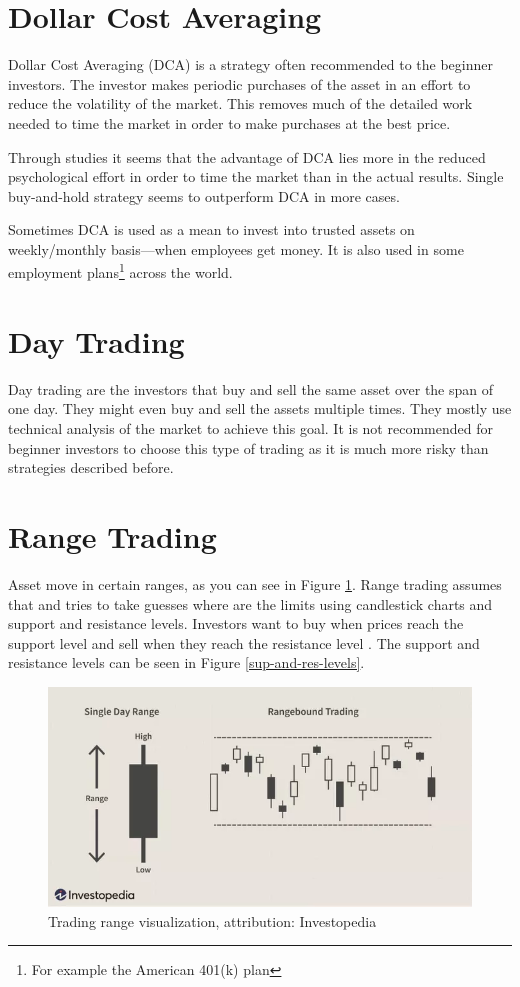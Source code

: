 \section{Dollar Cost Averaging}
Dollar Cost Averaging (DCA) is a strategy often recommended to the beginner investors. The investor makes periodic purchases of the asset in an effort to reduce the volatility of the market. This removes much of the detailed work needed to time the market in order to make purchases at the best price.

Through studies \cite{DCA-study} it seems that the advantage of DCA lies more in the reduced psychological effort in order to time the market than in the actual results. Single buy-and-hold strategy seems to outperform DCA in more cases.

Sometimes DCA is used as a mean to invest into trusted assets on weekly/monthly basis---when employees get money. It is also used in some employment plans\footnote{For example the American 401(k) plan} across the world.

\section{Day Trading}
Day trading are the investors that buy and sell the same asset over the span of one day. They might even buy and sell the assets multiple times. They mostly use technical analysis of the market to achieve this goal. It is not recommended for beginner investors to choose this type of trading as it is much more risky than strategies described before.

\section{Range Trading}
Asset move in certain ranges, as you can see in Figure \ref{trading-range-figure}. Range trading assumes that and tries to take guesses where are the limits using candlestick charts and support and resistance levels. Investors want to buy when prices reach the support level and sell when they reach the resistance level \cite{5types-of-daytrading}. The support and resistance levels can be seen in Figure \ref{sup-and-res-levels}.

\begin{figure}[ht]
    \centering
    \includegraphics[width=\columnwidth]{figures/trading-range.png}
    \caption{Trading range visualization, attribution: Investopedia \cite{investopedia:trading-range}}
    \label{trading-range-figure}
\end{figure}

